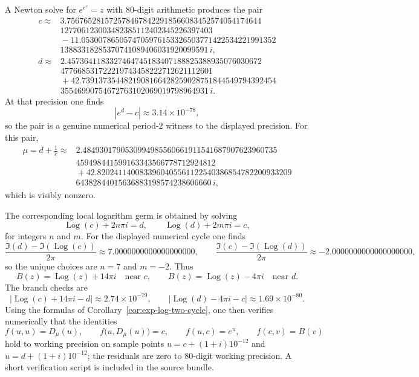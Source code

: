 \documentclass[11pt]{amsart}
\numberwithin{equation}{section}
\theoremstyle{remark}
\theoremstyle{definition}
\newcommand{\Logp}{\operatorname{Log}}
\begin{document}
A Newton solve for $e^{e^z}=z$ with $80$-digit arithmetic produces the pair
\[
\begin{aligned}
c \approx{}& 3.7567652815725784678422918566083452574054174644\\
&127706123003482385112402345226397403\\
&{}-11.0530078650574705976153326503771422534221991352\\
&13883318285370741089406031920099591\, i,
\end{aligned}
\]
\[
\begin{aligned}
d \approx{}& 2.4573641183327464745183407188825388935076030672\\
&477668531722219743458222712621112601\\
&{}+42.7391373544821908166428259028751844549794392454\\
&35546990754672763102069019798964931\, i.
\end{aligned}
\]
At that precision one finds
\[
|e^d-c|\approx 3.14\times 10^{-78},
\]
so the pair is a genuine numerical period-$2$ witness to the displayed precision. For this pair,
\[
\begin{aligned}
\mu=d+\frac{1}{c}\approx{}& 2.4849301790530994985560661911541687907623960735\\
&459498441599163343566778712924812\\
&{}+42.8202411400833960405561122540386854782200933209\\
&64382844015636883198574238606660\, i,
\end{aligned}
\]
which is visibly nonzero.

The corresponding local logarithm germ is obtained by solving
\[
\Logp(c)+2n\pi i=d,
\qquad
\Logp(d)+2m\pi i=c,
\]
for integers $n$ and $m$. For the displayed numerical cycle one finds
\[
\frac{\Im(d)-\Im(\Logp(c))}{2\pi}\approx 7.0000000000000000000,
\qquad
\frac{\Im(c)-\Im(\Logp(d))}{2\pi}\approx -2.0000000000000000000,
\]
so the unique choices are $n=7$ and $m=-2$. Thus
\[
B(z)=\Logp(z)+14\pi i \quad \text{near } c,
\qquad
B(z)=\Logp(z)-4\pi i \quad \text{near } d.
\]
The branch checks are
\[
\bigl|\Logp(c)+14\pi i-d\bigr|\approx 2.74\times 10^{-79},
\qquad
\bigl|\Logp(d)-4\pi i-c\bigr|\approx 1.69\times 10^{-80}.
\]
Using the formulas of Corollary~\ref{cor:exp-log-two-cycle}, one then verifies numerically that the identities
\[
f(u,u)=D_\mu(u),\qquad f\bigl(u,D_\mu(u)\bigr)=c,
\qquad f(u,c)=e^u,
\qquad f(c,v)=B(v)
\]
hold to working precision on sample points $u=c+(1+i)10^{-12}$ and $u=d+(1+i)10^{-12}$; the residuals are zero to $80$-digit working precision. A short verification script is included in the source bundle.
\end{document}
